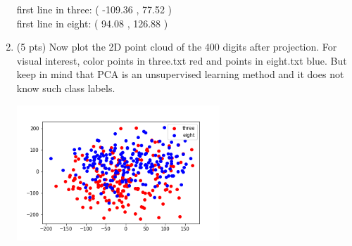\documentclass[a4paper]{article}
\theoremstyle{definition}
\newenvironment{soln}{
    \leavevmode\color{blue}\ignorespaces
}{}
\begin{document}
\begin{enumerate}
\begin{soln}
first line in three: ( -109.36 , 77.52 )\\
first line in eight: ( 94.08 , 126.88 )
\end{soln}

\item (5 pts) Now plot the 2D point cloud of the 400 digits after projection.
For visual interest, color points in three.txt red and points in eight.txt blue.
But keep in mind that PCA is an unsupervised learning method and it does not know such class labels.

\begin{soln}
\begin{center}
\includegraphics[width=0.6\textwidth]{q46.png}
\end{center}
\end{soln}
\end{enumerate}
\end{document}

